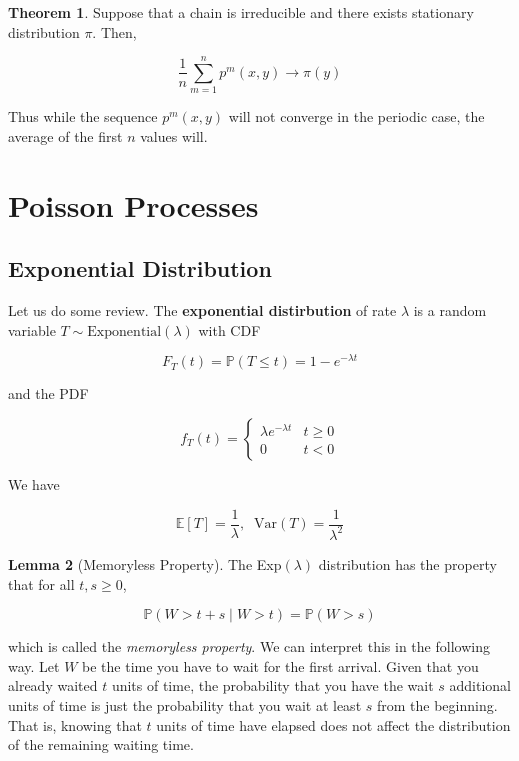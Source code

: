 \documentclass{article}
\theoremstyle{definition}
\newtheorem{theorem}{Theorem}[section]
\newtheorem{lemma}[theorem]{Lemma}
\theoremstyle{remark}
\theoremstyle{definition}
\begin{document}
    \begin{theorem}
      Suppose that a chain is irreducible and there exists stationary distribution $\pi$. Then, 

        \[\frac{1}{n} \sum_{m=1}^n p^m (x, y) \rightarrow \pi(y)\]

      Thus while the sequence $p^m (x, y)$ will not converge in the periodic case, the average of the first $n$ values will. 
    \end{theorem}

\section{Poisson Processes}

  \subsection{Exponential Distribution}

    Let us do some review. The \textbf{exponential distirbution} of rate $\lambda$ is a random variable $T \sim \mathrm{Exponential}(\lambda)$ with CDF 

      \[F_T (t) = \mathbb{P}(T \leq t) = 1 - e^{-\lambda t}\]

    and the PDF 

      \[f_T (t) = \begin{cases} \lambda e^{-\lambda t} & t \geq 0 \\ 0 & t < 0 \end{cases}\]

    We have 

      \[\mathbb{E}[T] = \frac{1}{\lambda}, \;\; \mathrm{Var}(T) = \frac{1}{\lambda^2}\]

    \begin{lemma}[Memoryless Property]
      The Exp$(\lambda)$ distribution has the property that for all $t, s \geq 0$, 

        \[\mathbb{P}(W > t + s \; | \; W > t) = \mathbb{P}(W > s)\]

      which is called the \textit{memoryless property}. We can interpret this in the following way. Let $W$ be the time you have to wait for the first arrival. Given that you already waited $t$ units of time, the probability that you have the wait $s$ additional units of time is just the probability that you wait at least $s$ from the beginning. That is, knowing that $t$ units of time have elapsed does not affect the distribution of the remaining waiting time. 
    \end{lemma}
\end{document}

